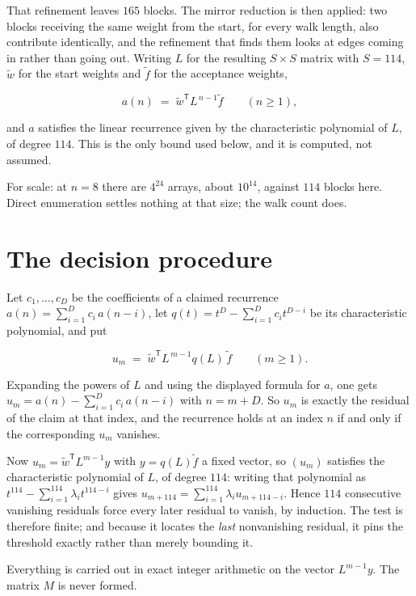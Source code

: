 \documentclass[11pt]{article}
\theoremstyle{definition}
\begin{document}
That refinement leaves $165$ blocks. The mirror reduction is then applied: two blocks receiving the same weight from the start, for every walk length, also contribute identically, and the refinement that finds them looks at edges coming in rather than going out. Writing $L$ for the resulting $S \times S$ matrix with $S = 114$, $\tilde w$ for the start weights and $\tilde f$ for the acceptance weights,

\[a(n) \;=\; \tilde w^{\mathsf T} L^{\,n-1} \tilde f \qquad (n \ge 1),\]

and $a$ satisfies the linear recurrence given by the characteristic polynomial of $L$, of degree $114$. This is the only bound used below, and it is computed, not assumed.

For scale: at $n = 8$ there are $4^{24}$ arrays, about $10^{14}$, against $114$ blocks here. Direct enumeration settles nothing at that size; the walk count does.

\section{The decision procedure}

Let $c_1,\dots,c_D$ be the coefficients of a claimed recurrence $a(n) = \sum_{i=1}^{D} c_i\,a(n-i)$, let $q(t) = t^{D} - \sum_{i=1}^{D} c_i t^{D-i}$ be its characteristic polynomial, and put

\[u_m \;=\; \tilde w^{\mathsf T} L^{\,m-1} q(L)\,\tilde f \qquad (m \ge 1).\]

Expanding the powers of $L$ and using the displayed formula for $a$, one gets $u_m = a(n) - \sum_{i=1}^{D} c_i\,a(n-i)$ with $n = m + D$. So $u_m$ is exactly the residual of the claim at that index, and the recurrence holds at an index $n$ if and only if the corresponding $u_m$ vanishes.

Now $u_m = \tilde w^{\mathsf T} L^{m-1} y$ with $y = q(L)\tilde f$ a fixed vector, so $(u_m)$ satisfies the characteristic polynomial of $L$, of degree $114$: writing that polynomial as $t^{114} - \sum_{i=1}^{114} \lambda_i t^{114-i}$ gives $u_{m+114} = \sum_{i=1}^{114} \lambda_i u_{m+114-i}$. Hence $114$ consecutive vanishing residuals force every later residual to vanish, by induction. The test is therefore finite; and because it locates the {\itshape last} nonvanishing residual, it pins the threshold exactly rather than merely bounding it.

Everything is carried out in exact integer arithmetic on the vector $L^{m-1}y$. The matrix $M$ is never formed.
\end{document}
